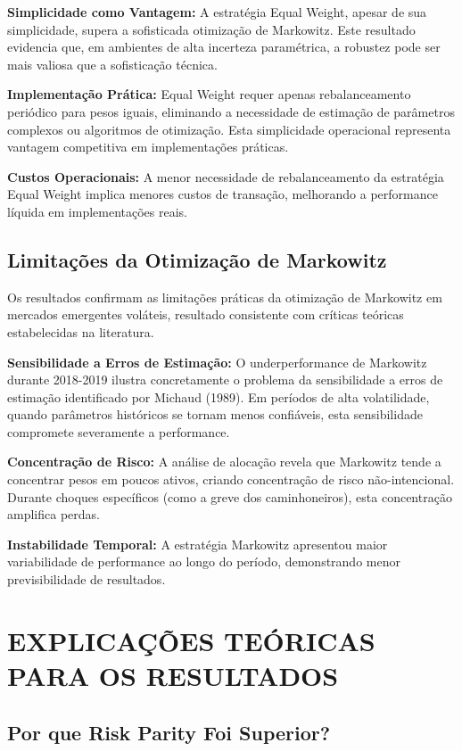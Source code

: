 \textbf{Simplicidade como Vantagem:} A estratégia Equal Weight, apesar de sua simplicidade, supera a sofisticada otimização de Markowitz. Este resultado evidencia que, em ambientes de alta incerteza paramétrica, a robustez pode ser mais valiosa que a sofisticação técnica.

\textbf{Implementação Prática:} Equal Weight requer apenas rebalanceamento periódico para pesos iguais, eliminando a necessidade de estimação de parâmetros complexos ou algoritmos de otimização. Esta simplicidade operacional representa vantagem competitiva em implementações práticas.

\textbf{Custos Operacionais:} A menor necessidade de rebalanceamento da estratégia Equal Weight implica menores custos de transação, melhorando a performance líquida em implementações reais.

\subsection{Limitações da Otimização de Markowitz}

Os resultados confirmam as limitações práticas da otimização de Markowitz em mercados emergentes voláteis, resultado consistente com críticas teóricas estabelecidas na literatura.

\textbf{Sensibilidade a Erros de Estimação:} O underperformance de Markowitz durante 2018-2019 ilustra concretamente o problema da sensibilidade a erros de estimação identificado por Michaud (1989). Em períodos de alta volatilidade, quando parâmetros históricos se tornam menos confiáveis, esta sensibilidade compromete severamente a performance.

\textbf{Concentração de Risco:} A análise de alocação revela que Markowitz tende a concentrar pesos em poucos ativos, criando concentração de risco não-intencional. Durante choques específicos (como a greve dos caminhoneiros), esta concentração amplifica perdas.

\textbf{Instabilidade Temporal:} A estratégia Markowitz apresentou maior variabilidade de performance ao longo do período, demonstrando menor previsibilidade de resultados.

\section{EXPLICAÇÕES TEÓRICAS PARA OS RESULTADOS}

\subsection{Por que Risk Parity Foi Superior?}

